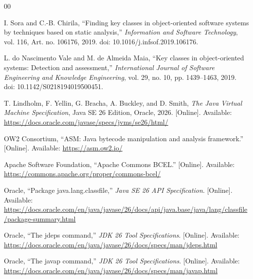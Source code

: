 \documentclass[conference]{IEEEtran}
\begin{document}
	
	\begin{thebibliography}{00}
		
		I. Sora and C.-B. Chirila,
		``Finding key classes in object-oriented software
		systems by techniques based on static analysis,''
		\textit{Information and Software Technology},
		vol. 116, Art. no. 106176, 2019.
		doi: 10.1016/j.infsof.2019.106176.
		
		L. do Nascimento Vale and M. de Almeida Maia,
		``Key classes in object-oriented systems:
		Detection and assessment,''
		\textit{International Journal of Software
			Engineering and Knowledge Engineering},
		vol. 29, no. 10, pp. 1439--1463, 2019.
		doi: 10.1142/S0218194019500451.
		
		T. Lindholm, F. Yellin, G. Bracha,
		A. Buckley, and D. Smith,
		\textit{The Java Virtual Machine Specification},
		Java SE 26 Edition, Oracle, 2026.
		[Online]. Available:
		\url{https://docs.oracle.com/javase/specs/jvms/se26/html/}
		
		OW2 Consortium,
		``ASM: Java bytecode manipulation
		and analysis framework.''
		[Online]. Available:
		\url{https://asm.ow2.io/}
		
		Apache Software Foundation,
		``Apache Commons BCEL.''
		[Online]. Available:
		\url{https://commons.apache.org/proper/commons-bcel/}
		
		Oracle,
		``Package java.lang.classfile,''
		\textit{Java SE 26 API Specification}.
		[Online]. Available:
		\url{https://docs.oracle.com/en/java/javase/26/docs/api/java.base/java/lang/classfile/package-summary.html}
		
		Oracle,
		``The jdeps command,''
		\textit{JDK 26 Tool Specifications}.
		[Online]. Available:
		\url{https://docs.oracle.com/en/java/javase/26/docs/specs/man/jdeps.html}
		
		Oracle,
		``The javap command,''
		\textit{JDK 26 Tool Specifications}.
		[Online]. Available:
		\url{https://docs.oracle.com/en/java/javase/26/docs/specs/man/javap.html}
		
	\end{thebibliography}
	
\end{document}
